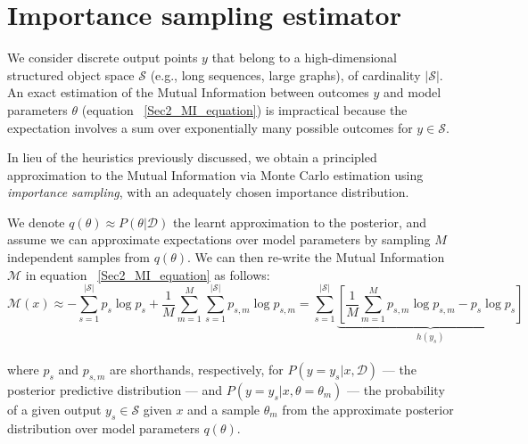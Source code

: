 \section{Importance sampling estimator}
\label{Sec3_Estimator}

We consider discrete output points $y$ that belong to a high-dimensional structured object space $\mathcal{S}$ (e.g., long sequences, large graphs), of cardinality $|\mathcal{S}|$. An exact estimation of the Mutual Information between outcomes $y$ and model parameters $\theta$ (equation ~\ref{Sec2_MI_equation}) is impractical because the expectation involves a sum over exponentially many possible outcomes for $y \in \mathcal{S}$. 
 
In lieu of the heuristics previously discussed, we obtain a principled approximation to the Mutual Information via Monte Carlo estimation using \emph{importance sampling}, with an adequately chosen importance distribution.

We denote $q(\theta) \approx P(\theta|\mathcal{D})$ the learnt approximation to the posterior, and assume we can approximate expectations over model parameters by sampling $M$ independent samples from $q(\theta)$.
We can then re-write the Mutual Information $\mathcal{M}$ in equation ~\ref{Sec2_MI_equation} as follows:
\vspace{-2mm}
\begin{equation}
\mathcal{M}(x)
 \approx - \sum_{s=1}^{|\mathcal{S}|}p_s \log p_s + \frac{1}{M}\sum_{m=1}^M{\sum_{s=1}^{|\mathcal{S}|}{p_{s,m} \log p_{s,m}}}
 =  \sum_{s=1}^{|\mathcal{S}|}\underbrace{\left[\frac{1}{M}\sum_{m=1}^M{p_{s,m} \log p_{s,m}} - p_s \log p_s \right]}_{h(y_s)}
 \label{Equation_MI_pre_IS}
\end{equation}
\vspace{-3mm}
\\
where $p_s$ and $p_{s,m}$ are shorthands, respectively, for $P(y=y_s|x,\mathcal{D})$ --- the posterior predictive distribution --- and $P(y=y_s|x,\theta=\theta_m)$ --- the probability of a given output $y_s\in\mathcal{S}$ given $x$ and a sample $\theta_m$ from the approximate posterior distribution over model parameters $q(\theta)$. 

